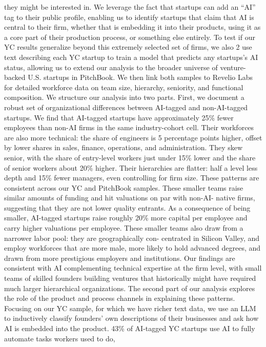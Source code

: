 they might be interested in. We leverage the fact that startups can add an “AI” tag to their public
profile, enabling us to identify startups that claim that AI is central to their firm, whether that is
embedding it into their products, using it as a core part of their production process, or something
else entirely. To test if our YC results generalize beyond this extremely selected set of firms, we also
2
use text describing each YC startup to train a model that predicts any startups’s AI status, allowing
us to extend our analysis to the broader universe of venture-backed U.S. startups in PitchBook. We
then link both samples to Revelio Labs for detailed workforce data on team size, hierarchy, seniority,
and functional composition.
We structure our analysis into two parts. First, we document a robust set of organizational
differences between AI-tagged and non-AI-tagged startups. We find that AI-tagged startups have
approximately 25\% fewer employees than non-AI firms in the same industry-cohort cell.
Their
workforces are also more technical: the share of engineers is 5 percentage points higher, offset by
lower shares in sales, finance, operations, and administration. They skew senior, with the share of
entry-level workers just under 15\% lower and the share of senior workers about 20\% higher. Their
hierarchies are flatter: half a level less depth and 15\% fewer managers, even controlling for firm size.
These patterns are consistent across our YC and PitchBook samples.
These smaller teams raise similar amounts of funding and hit valuations on par with non-AI-
native firms, suggesting that they are not lower quality entrants. As a consequence of being smaller,
AI-tagged startups raise roughly 20\% more capital per employee and carry higher valuations per
employee. These smaller teams also draw from a narrower labor pool: they are geographically con-
centrated in Silicon Valley, and employ workforces that are more male, more likely to hold advanced
degrees, and drawn from more prestigious employers and institutions. Our findings are consistent
with AI complementing technical expertise at the firm level, with small teams of skilled founders
building ventures that historically might have required much larger hierarchical organizations.
The second part of our analysis explores the role of the product and process channels in explaining
these patterns. Focusing on our YC sample, for which we have richer text data, we use an LLM
to inductively classify founders’ own descriptions of their businesses and ask how AI is embedded
into the product. 43\% of AI-tagged YC startups use AI to fully automate tasks workers used to do,
